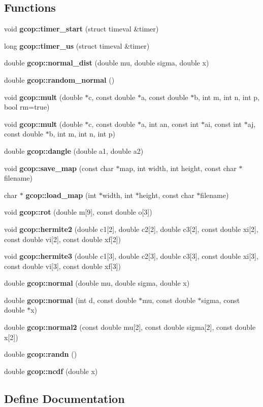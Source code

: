\subsection*{\-Functions}
\begin{DoxyCompactItemize}
\item 
void {\bf gcop\-::timer\-\_\-start} (struct timeval \&timer)
\item 
long {\bf gcop\-::timer\-\_\-us} (struct timeval \&timer)
\item 
double {\bf gcop\-::normal\-\_\-dist} (double mu, double sigma, double x)
\item 
double {\bf gcop\-::random\-\_\-normal} ()
\item 
void {\bf gcop\-::mult} (double $\ast$c, const double $\ast$a, const double $\ast$b, int m, int n, int p, bool rm=true)
\item 
void {\bf gcop\-::mult} (double $\ast$c, const double $\ast$a, int an, const int $\ast$ai, const int $\ast$aj, const double $\ast$b, int m, int n, int p)
\item 
double {\bf gcop\-::dangle} (double a1, double a2)
\item 
void {\bf gcop\-::save\-\_\-map} (const char $\ast$map, int width, int height, const char $\ast$filename)
\item 
char $\ast$ {\bf gcop\-::load\-\_\-map} (int $\ast$width, int $\ast$height, const char $\ast$filename)
\item 
void {\bf gcop\-::rot} (double m[9], const double o[3])
\item 
void {\bf gcop\-::hermite2} (double c1[2], double c2[2], double c3[2], const double xi[2], const double vi[2], const double xf[2])
\item 
void {\bf gcop\-::hermite3} (double c1[3], double c2[3], double c3[3], const double xi[3], const double vi[3], const double xf[3])
\item 
double {\bf gcop\-::normal} (double mu, double sigma, double x)
\item 
double {\bf gcop\-::normal} (int d, const double $\ast$mu, const double $\ast$sigma, const double $\ast$x)
\item 
double {\bf gcop\-::normal2} (const double mu[2], const double sigma[2], const double x[2])
\item 
double {\bf gcop\-::randn} ()
\item 
double {\bf gcop\-::ncdf} (double x)
\end{DoxyCompactItemize}


\subsection{\-Define \-Documentation}
